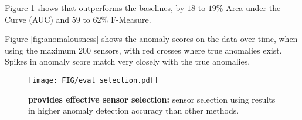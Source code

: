 Figure \ref{fig:eval_selection} shows that \method outperforms the baselines, by $18$ to $19\%$ Area under the Curve (AUC) and $59$ to $62\%$ F-Measure. 

Figure \ref{fig:anomalousness} shows the \method anomaly scores on the \datasmall data over time, when using the maximum $200$ sensors, with red crosses where true anomalies exist. Spikes in anomaly score match very closely with the true anomalies.

\begin{figure}[h!]
    \centering
    \texttt{[image: FIG/eval\_selection.pdf]}
    \caption{\label{fig:eval_selection}\textbf{\method provides effective sensor selection:}  sensor selection using \method results in higher anomaly detection accuracy than other methods.}
\end{figure}

